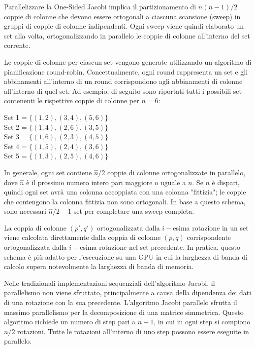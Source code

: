 Parallelizzare la One-Sided Jacobi implica il partizionamento di $n(n-1)/2$ coppie di colonne che devono essere ortogonali a ciascuna scansione (sweep) in gruppi di coppie di colonne indipendenti. Ogni sweep viene quindi elaborato un set alla volta, ortogonalizzando in parallelo le coppie di colonne all'interno del set corrente.

Le coppie di colonne per ciascun set vengono generate utilizzando un algoritmo di pianificazione round-robin. Concettualmente, ogni round rappresenta un set e gli abbinamenti all'interno di un round corrispondono agli abbinamenti di colonne all'interno di quel set. Ad esempio, di seguito sono riportati tutti i possibili set contenenti le rispettive coppie di colonne per $n = 6$:
\begin{center}
	Set 1 = $\{(1,2),(3,4),(5,6)\}$\\
	Set 2 = $\{(1,4),(2,6),(3,5)\}$\\
	Set 3 = $\{(1,6),(2,3),(4,5)\}$\\
	Set 4 = $\{(1,5),(2,4),(3,6)\}$\\
	Set 5 = $\{(1,3),(2,5),(4,6)\}$\\
\end{center}
In generale, ogni set contiene $\hat{n}/2$ coppie di colonne ortogonalizzate in parallelo, dove $\hat{n}$ è il prossimo numero intero pari maggiore o uguale a $n$. Se $n$ è dispari, quindi ogni set avrà una colonna accoppiata con una colonna "fittizia"; le coppie che contengono la colonna fittizia non sono ortogonali. In base a questo schema, sono necessari $\hat{n}/2 - 1$ set per completare una sweep completa.

La coppia di colonne $(p', q')$ ortogonalizzata dalla $i-$esima rotazione in un set viene calcolata direttamente dalla coppia di colonne $(p, q)$ corrispondente ortogonalizzata dalla $i-$esima rotazione nel set precedente. In pratica, questo schema è più adatto per l'esecuzione su una GPU in cui la larghezza di banda di calcolo supera notevolmente la larghezza di banda di memoria. \cite{Romer:SVD}

Nelle tradizionali implementazioni sequenziali dell'algoritmo Jacobi, il parallelismo non viene sfruttato, principalmente a causa della dipendenza dei dati di una rotazione con la sua precedente. L'algoritmo Jacobi parallelo sfrutta il massimo parallelismo per la decomposizione di una matrice simmetrica. Questo algoritmo richiede un numero di step pari a $n - 1$, in cui in ogni step si compiono $n/2$ rotazioni. Tutte le rotazioni all'interno di uno step possono essere eseguite in parallelo. \cite{Acosta:SVD}

